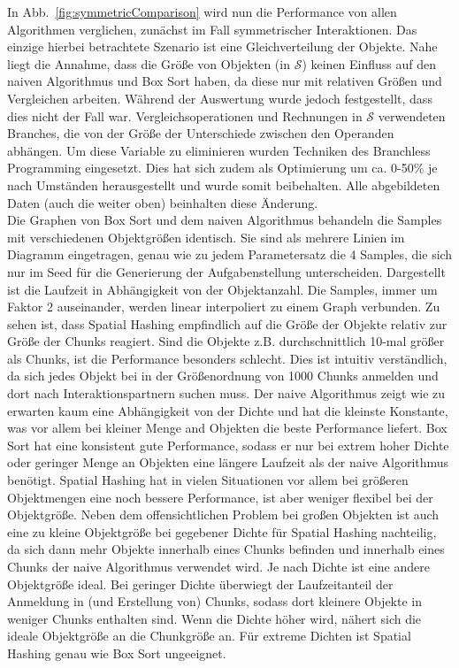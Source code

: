 In Abb.~\ref{fig:symmetricComparison} wird nun die Performance von allen Algorithmen verglichen, zunächst im Fall symmetrischer Interaktionen. Das einzige hierbei betrachtete Szenario ist eine Gleichverteilung der Objekte. Nahe liegt die Annahme, dass die Größe von Objekten (in $\mathcal{S}$) keinen Einfluss auf den naiven Algorithmus und Box Sort haben, da diese nur mit relativen Größen und Vergleichen arbeiten. Während der Auswertung wurde jedoch festgestellt, dass dies nicht der Fall war. Vergleichsoperationen und Rechnungen in $\mathcal{S}$ verwendeten Branches, die von der Größe der Unterschiede zwischen den Operanden abhängen. Um diese Variable zu eliminieren wurden Techniken des Branchless Programming eingesetzt. Dies hat sich zudem als Optimierung um ca. 0-50\% je nach Umständen herausgestellt und wurde somit beibehalten. Alle abgebildeten Daten (auch die weiter oben) beinhalten diese Änderung.\\
Die Graphen von Box Sort und dem naiven Algorithmus behandeln die Samples mit verschiedenen Objektgrößen identisch. Sie sind als mehrere Linien im Diagramm eingetragen, genau wie zu jedem Parametersatz die 4 Samples, die sich nur im Seed für die Generierung der Aufgabenstellung unterscheiden. Dargestellt ist die Laufzeit in Abhängigkeit von der Objektanzahl. Die Samples, immer um Faktor 2 auseinander, werden linear interpoliert zu einem Graph verbunden. Zu sehen ist, dass Spatial Hashing empfindlich auf die Größe der Objekte relativ zur Größe der Chunks reagiert. Sind die Objekte z.B. durchschnittlich 10-mal größer als Chunks, ist die Performance besonders schlecht. Dies ist intuitiv verständlich, da sich jedes Objekt bei in der Größenordnung von 1000 Chunks anmelden und dort nach Interaktionspartnern suchen muss. Der naive Algorithmus zeigt wie zu erwarten kaum eine Abhängigkeit von der Dichte und hat die kleinste Konstante, was vor allem bei kleiner Menge and Objekten die beste Performance liefert. Box Sort hat eine konsistent gute Performance, sodass er nur bei extrem hoher Dichte oder geringer Menge an Objekten eine längere Laufzeit als der naive Algorithmus benötigt. Spatial Hashing hat in vielen Situationen vor allem bei größeren Objektmengen eine noch bessere Performance, ist aber weniger flexibel bei der Objektgröße. Neben dem offensichtlichen Problem bei großen Objekten ist auch eine zu kleine Objektgröße bei gegebener Dichte für Spatial Hashing nachteilig, da sich dann mehr Objekte innerhalb eines Chunks befinden und innerhalb eines Chunks der naive Algorithmus verwendet wird. Je nach Dichte ist eine andere Objektgröße ideal. Bei geringer Dichte überwiegt der Laufzeitanteil der Anmeldung in (und Erstellung von) Chunks, sodass dort kleinere Objekte in weniger Chunks enthalten sind. Wenn die Dichte höher wird, nähert sich die ideale Objektgröße an die Chunkgröße an. Für extreme Dichten ist Spatial Hashing genau wie Box Sort ungeeignet.\\


